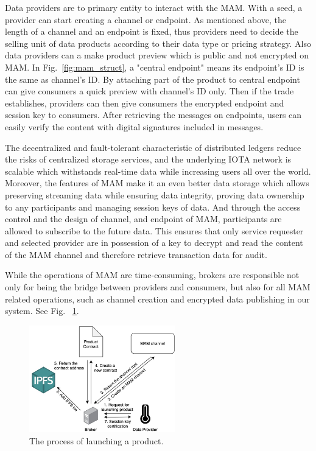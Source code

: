 \documentclass[conference]{IEEEtran}
\begin{document}
Data providers are to primary entity to interact with the MAM. With a seed, a provider can start creating a channel or endpoint. As mentioned above, the length of a channel and an endpoint is fixed, thus providers need to decide the selling unit of data products according to their data type or pricing strategy. Also data providers can a make product preview which is public and not encrypted on MAM. In Fig.~\ref{fig:mam_struct}, a "central endpoint" means its endpoint's ID is the same as channel's ID. By attaching part of the product to central endpoint can give consumers a quick preview with channel's ID only. Then if the trade establishes, providers can then give consumers the encrypted endpoint and session key to consumers. After retrieving the messages on endpoints, users can easily verify the content with digital signatures included in messages. 

The decentralized and fault-tolerant characteristic of distributed ledgers reduce the risks of centralized storage services, and the underlying IOTA network is scalable which withstands real-time data while increasing users all over the world. Moreover, the features of MAM make it an even better data storage which allows preserving streaming data while ensuring data integrity, proving data ownership to any participants and managing session keys of data. And through the access control and the design of channel, and endpoint of MAM, participants are allowed to subscribe to the future data. This ensures that only service requester and selected provider are in possession of a key to decrypt and read the content of the MAM channel and therefore retrieve transaction data for audit.

While the operations of MAM are time-consuming, brokers are responsible not only for being the bridge between providers and consumers, but also for all MAM related operations, such as channel creation and encrypted data publishing in our system. See Fig.~ \ref{fig:launching_product}.

\begin{figure}[!t]
    \centering
    \includegraphics[width=2.5in]{launching_product}
    \caption{The process of launching a product.}
    \label{fig:launching_product}
\end{figure}
\end{document}
